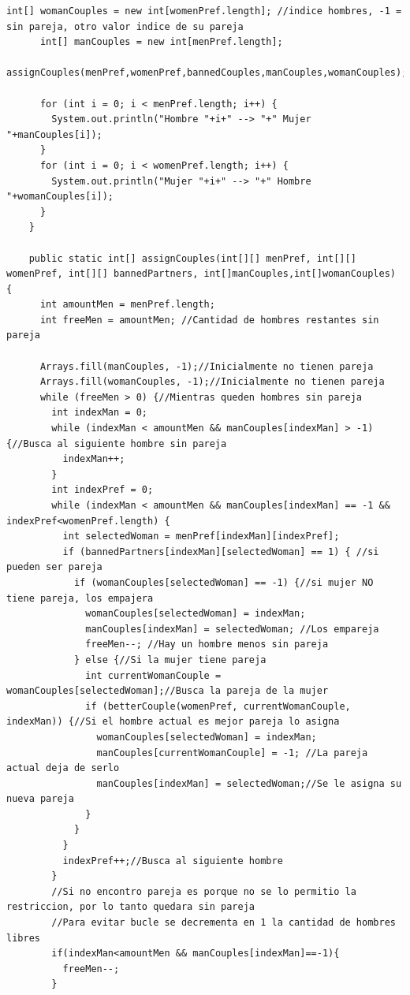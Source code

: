 \begin{enumerate}[a)]
\begin{lstlisting}[style=java,caption= Implementacion problema de las parejas con asignaciones estables]
      int[] womanCouples = new int[womenPref.length]; //indice hombres, -1 = sin pareja, otro valor indice de su pareja
      int[] manCouples = new int[menPref.length];
      assignCouples(menPref,womenPref,bannedCouples,manCouples,womanCouples);
  
      for (int i = 0; i < menPref.length; i++) {
        System.out.println("Hombre "+i+" --> "+" Mujer "+manCouples[i]);
      }
      for (int i = 0; i < womenPref.length; i++) {
        System.out.println("Mujer "+i+" --> "+" Hombre "+womanCouples[i]);
      }
    }
  
    public static int[] assignCouples(int[][] menPref, int[][] womenPref, int[][] bannedPartners, int[]manCouples,int[]womanCouples) {
      int amountMen = menPref.length;
      int freeMen = amountMen; //Cantidad de hombres restantes sin pareja
  
      Arrays.fill(manCouples, -1);//Inicialmente no tienen pareja
      Arrays.fill(womanCouples, -1);//Inicialmente no tienen pareja
      while (freeMen > 0) {//Mientras queden hombres sin pareja
        int indexMan = 0;
        while (indexMan < amountMen && manCouples[indexMan] > -1) {//Busca al siguiente hombre sin pareja
          indexMan++;
        }
        int indexPref = 0;
        while (indexMan < amountMen && manCouples[indexMan] == -1 && indexPref<womenPref.length) {
          int selectedWoman = menPref[indexMan][indexPref];
          if (bannedPartners[indexMan][selectedWoman] == 1) { //si pueden ser pareja
            if (womanCouples[selectedWoman] == -1) {//si mujer NO tiene pareja, los empajera
              womanCouples[selectedWoman] = indexMan;
              manCouples[indexMan] = selectedWoman; //Los empareja
              freeMen--; //Hay un hombre menos sin pareja
            } else {//Si la mujer tiene pareja
              int currentWomanCouple = womanCouples[selectedWoman];//Busca la pareja de la mujer
              if (betterCouple(womenPref, currentWomanCouple, indexMan)) {//Si el hombre actual es mejor pareja lo asigna
                womanCouples[selectedWoman] = indexMan;
                manCouples[currentWomanCouple] = -1; //La pareja actual deja de serlo
                manCouples[indexMan] = selectedWoman;//Se le asigna su nueva pareja
              }
            }
          }
          indexPref++;//Busca al siguiente hombre
        }
        //Si no encontro pareja es porque no se lo permitio la restriccion, por lo tanto quedara sin pareja
        //Para evitar bucle se decrementa en 1 la cantidad de hombres libres
        if(indexMan<amountMen && manCouples[indexMan]==-1){
          freeMen--;
        }
  

\end{lstlisting}
\end{enumerate}
